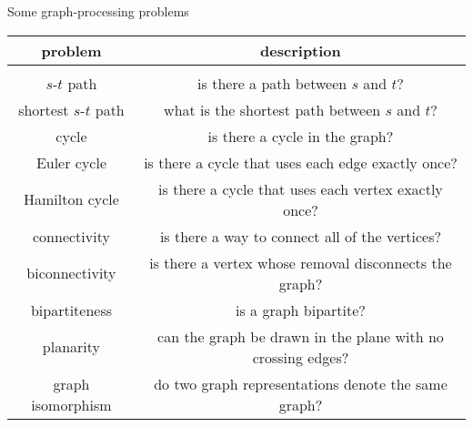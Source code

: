 \documentclass[8pt,a4paper,compress]{beamer}
\begin{document}
\begin{frame}[fragile]
Example: coauthorship graph

\smallskip

\begin{center}
\texttt{[image: \{./figures/erdos]}.png}
\end{center}
\end{frame}

\begin{frame}[fragile]
Some graph-processing problems
\begin{center}
\begin{tabular}{cc}
problem & description \\ \hline \\
$s$-$t$ path & is there a path between $s$ and $t$? \\ 
shortest $s$-$t$ path & what is the shortest path between $s$ and $t$? \\
cycle & is there a cycle in the graph? \\
Euler cycle & is there a cycle that uses each edge exactly once? \\
Hamilton cycle & is there a cycle that uses each vertex exactly once? \\
connectivity & is there a way to connect all of the vertices? \\
biconnectivity & is there a vertex whose removal disconnects the graph? \\
bipartiteness & is a graph bipartite? \\ 
planarity & can the graph be drawn in the plane with no crossing edges? \\
graph isomorphism & do two graph representations denote the same graph?
\end{tabular}  
\end{center}
\end{frame}
\end{document}
